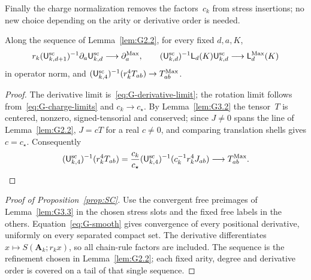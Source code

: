 Finally the charge normalization removes the factors~$c_k$ from stress insertions; no new choice depending on the arity or derivative order is needed.
\begin{lemma}\label{lem:G3.3}
Along the sequence of Lemma~\ref{lem:G2.2}, for every fixed $d,a,K$,
\begin{equation*}
r_k(\mathsf{U}_{k,d+1}^{\mathrm{sc}})^{-1}\partial_a\mathsf{U}_{k,d}^{\mathrm{sc}}
 \longrightarrow\partial_a^{\rm Max},\qquad
(\mathsf{U}_{k,d}^{\mathrm{sc}})^{-1}\mathsf L_d(K)\mathsf{U}_{k,d}^{\mathrm{sc}}
 \longrightarrow\mathsf L_d^{\rm Max}(K)
\end{equation*}
in operator norm, and $(\mathsf{U}_{k,4}^{\mathrm{sc}})^{-1}(r_k^4T_{ab})\to T^{\mathrm{Max}}_{ab}$.
\end{lemma}
\begin{proof}
The derivative limit is~\eqref{eq:G-derivative-limit}; the rotation limit follows from~\eqref{eq:G-charge-limits} and $c_k\to c_\star$. By Lemma~\ref{lem:G3.2} the tensor~$T$ is centered, nonzero, signed-tensorial and conserved; since $J\ne0$ spans the line of Lemma~\ref{lem:G2.2}, $J=cT$ for a real $c\ne0$, and comparing translation shells gives $c=c_\star$. Consequently
\begin{equation*}
(\mathsf{U}_{k,4}^{\mathrm{sc}})^{-1}(r_k^4T_{ab})
 =\frac{c_k}{c_\star}
   (\mathsf{U}_{k,4}^{\mathrm{sc}})^{-1}(c_k^{-1}r_k^4J_{ab})
 \longrightarrow T^{\mathrm{Max}}_{ab}.\qedhere
\end{equation*}
\end{proof}
\begin{proof}[Proof of Proposition~\ref{prop:SC}]
Use the convergent free preimages of Lemma~\ref{lem:G3.3} in the chosen stress slots and the fixed free labels in the others. Equation~\eqref{eq:G-smooth} gives convergence of every positional derivative, uniformly on every separated compact set. The derivative differentiates $x\mapsto S(\boldsymbol A_k;r_kx)$, so all chain-rule factors are included. The sequence is the refinement chosen in Lemma~\ref{lem:G2.2}; each fixed arity, degree and derivative order is covered on a tail of that single sequence.
\end{proof}
